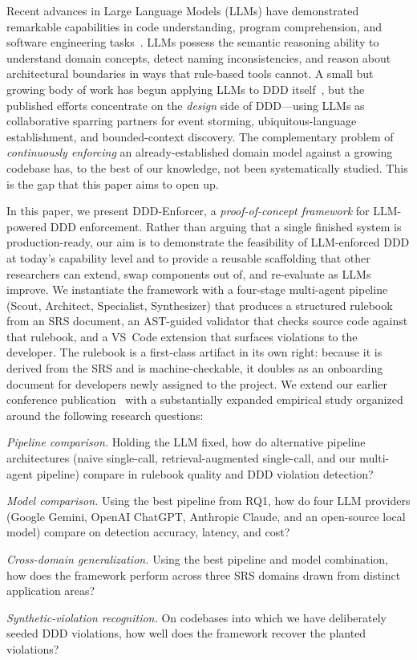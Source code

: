 \documentclass[smallextended]{svjour3}
\begin{document}
Recent advances in Large Language Models (LLMs) have demonstrated remarkable capabilities in code understanding, program comprehension, and software engineering tasks~\cite{hou2024llm_se_survey}.
LLMs possess the semantic reasoning ability to understand domain concepts, detect naming inconsistencies, and reason about architectural boundaries in ways that rule-based tools cannot.
A small but growing body of work has begun applying LLMs to DDD itself~\cite{automatingddd2024, evans2024infoq}, but the published efforts concentrate on the \emph{design} side of DDD---using LLMs as collaborative sparring partners for event storming, ubiquitous-language establishment, and bounded-context discovery.
The complementary problem of \emph{continuously enforcing} an already-established domain model against a growing codebase has, to the best of our knowledge, not been systematically studied.
This is the gap that this paper aims to open up.

In this paper, we present DDD-Enforcer, a \emph{proof-of-concept framework} for LLM-powered DDD enforcement.
Rather than arguing that a single finished system is production-ready, our aim is to demonstrate the feasibility of LLM-enforced DDD at today's capability level and to provide a reusable scaffolding that other researchers can extend, swap components out of, and re-evaluate as LLMs improve.
We instantiate the framework with a four-stage multi-agent pipeline (Scout, Architect, Specialist, Synthesizer) that produces a structured rulebook from an SRS document, an AST-guided validator that checks source code against that rulebook, and a VS~Code extension that surfaces violations to the developer.
The rulebook is a first-class artifact in its own right: because it is derived from the SRS and is machine-checkable, it doubles as an onboarding document for developers newly assigned to the project.
We extend our earlier conference publication~\cite{dincoguz2025ddd_conference} with a substantially expanded empirical study organized around the following research questions:

\begin{description}[leftmargin=1.5cm, labelwidth=1cm]
\item[\textbf{RQ1}] \emph{Pipeline comparison.} Holding the LLM fixed, how do alternative pipeline architectures (naive single-call, retrieval-augmented single-call, and our multi-agent pipeline) compare in rulebook quality and DDD violation detection?
\item[\textbf{RQ2}] \emph{Model comparison.} Using the best pipeline from RQ1, how do four LLM providers (Google Gemini, OpenAI ChatGPT, Anthropic Claude, and an open-source local model) compare on detection accuracy, latency, and cost?
\item[\textbf{RQ3}] \emph{Cross-domain generalization.} Using the best pipeline and model combination, how does the framework perform across three SRS domains drawn from distinct application areas?
\item[\textbf{RQ4}] \emph{Synthetic-violation recognition.} On codebases into which we have deliberately seeded DDD violations, how well does the framework recover the planted violations?
\end{description}
\end{document}

